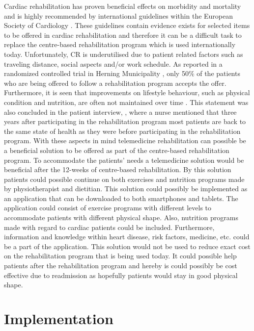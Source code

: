 Cardiac rehabilitation has proven beneficial effects on morbidity and mortality and is highly recommended by international guidelines within the European Society of Cardiology \cite{ESC}. These guidelines contain evidence exists for selected items to be offered in cardiac rehabilitation and therefore it can be a difficult task to replace the centre-based rehabilitation program which is used internationally today. Unfortunately, CR is underutilised due to patient related factors such as traveling distance, social aspects and/or work schedule. As reported in a randomized controlled trial in Herning Municipality \cite{rehab}, only 50\% of the patients who are being offered to follow a rehabilitation program accepts the offer. Furthermore, it is seen that improvements on lifestyle behaviour, such as physical condition and nutrition, are often not maintained over time \cite{CAD}. This statement was also concluded in the patient interview, , where a nurse mentioned that three years after participating in the rehabilitation program most patients are back to the same state of health as they were before participating in the rehabilitation program. With these aspects in mind telemedicine rehabilitation can possible be a beneficial solution to be offered as part of the centre-based rehabilitation program. To accommodate the patients’ needs a telemedicine solution would be beneficial after the 12-weeks of centre-based rehabilitation. By this solution patients could possible continue on both exercises and nutrition programs made by physiotherapist and dietitian. This solution could possibly be implemented as an application that can be downloaded to both smartphones and tablets. The application could consist of exercise programs with different levels to accommodate patients with different physical shape. Also, nutrition programs made with regard to cardiac patients could be included. Furthermore, information and knowledge within heart disease, risk factors, medicine, etc. could be a part of the application. This solution would not be used to reduce exact cost on the rehabilitation program that is being used today. It could possible help patients after the rehabilitation program and hereby is could possibly be cost effective due to readmission as hopefully patients would stay in good physical shape. 


\section{Implementation}

